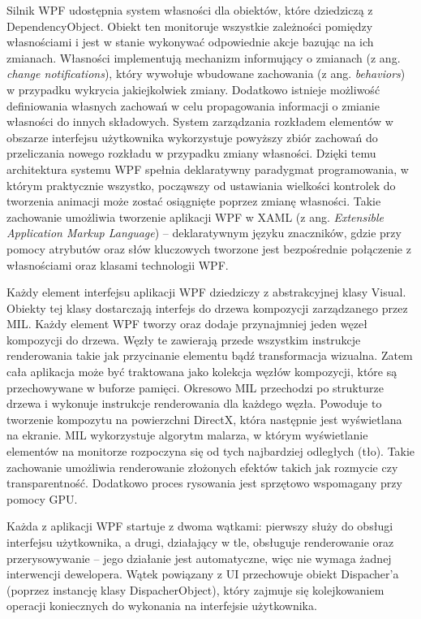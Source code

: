 Silnik WPF udostępnia system własności dla obiektów, które dziedziczą z DependencyObject. Obiekt ten monitoruje  wszystkie zależności pomiędzy własnościami i jest w stanie wykonywać odpowiednie akcje bazując na ich zmianach. Własności implementują mechanizm informujący o zmianach (z ang. \textit{change notifications}), który wywołuje wbudowane zachowania (z ang. \textit{behaviors}) w przypadku wykrycia jakiejkolwiek zmiany. Dodatkowo istnieje możliwość definiowania własnych zachowań w celu propagowania informacji o zmianie własności do innych składowych. System zarządzania rozkładem elementów w obszarze interfejsu użytkownika wykorzystuje powyższy zbiór zachowań do przeliczania nowego rozkładu w przypadku zmiany własności. Dzięki temu architektura systemu WPF spełnia deklaratywny paradygmat programowania, w którym praktycznie wszystko, począwszy od ustawiania wielkości kontrolek do tworzenia animacji może zostać osiągnięte poprzez zmianę własności. Takie zachowanie umożliwia tworzenie aplikacji WPF w XAML (z ang. \textit{Extensible Application Markup Language}) – deklaratywnym języku znaczników, gdzie przy pomocy atrybutów oraz słów kluczowych tworzone jest bezpośrednie połączenie z własnościami oraz klasami technologii WPF. 

Każdy element interfejsu aplikacji WPF dziedziczy z abstrakcyjnej klasy Visual. Obiekty tej klasy dostarczają interfejs do drzewa kompozycji zarządzanego przez MIL. Każdy element WPF tworzy oraz dodaje przynajmniej jeden węzeł kompozycji do drzewa. Węzły te zawierają przede wszystkim instrukcje renderowania takie jak przycinanie elementu bądź transformacja wizualna. Zatem cała aplikacja może być traktowana jako kolekcja węzłów kompozycji, które są przechowywane w buforze pamięci. Okresowo MIL przechodzi po strukturze drzewa i wykonuje instrukcje renderowania dla każdego węzła. Powoduje to tworzenie kompozytu na powierzchni DirectX, która następnie jest wyświetlana na ekranie.  MIL wykorzystuje algorytm malarza, w którym wyświetlanie elementów na monitorze rozpoczyna się od tych najbardziej odległych (tło). Takie zachowanie umożliwia renderowanie złożonych efektów takich jak rozmycie czy transparentność. Dodatkowo proces rysowania jest sprzętowo wspomagany przy pomocy GPU. 

Każda z aplikacji WPF startuje z dwoma wątkami: pierwszy służy do obsługi interfejsu użytkownika, a drugi, działający w tle, obsługuje renderowanie oraz przerysowywanie – jego działanie jest automatyczne, więc nie wymaga żadnej interwencji dewelopera. Wątek powiązany z UI przechowuje obiekt Dispacher’a (poprzez instancję klasy DispacherObject), który zajmuje się kolejkowaniem operacji koniecznych do wykonania na interfejsie użytkownika.

